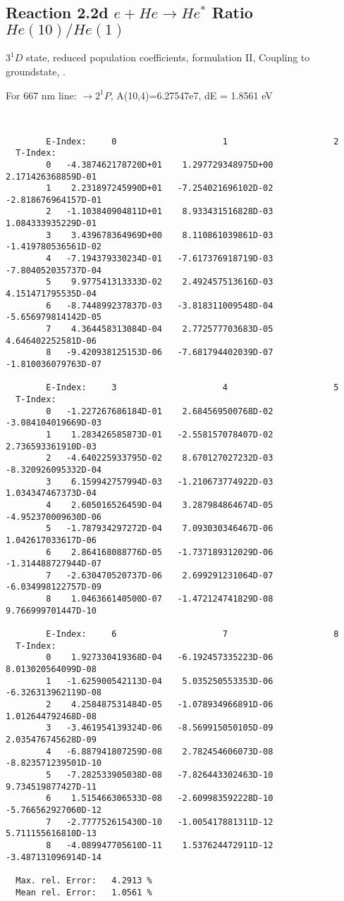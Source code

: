 \documentclass[12pt,dvipdfmx]{article}
\begin{document}
\subsection{
  Reaction 2.2d $e + He \rightarrow He^*  $ Ratio $He(10)/He(1)$
}

  $3^1D$ state,
  reduced population coefficients, formulation II,
  Coupling to groundstate, \cite{kn:Fujimoto}.

  For 667 nm line: $\rightarrow 2^1P$, A(10,4)=6.27547e7, dE = 1.8561 eV

\begin{small}\begin{verbatim}


        E-Index:     0                     1                     2
  T-Index:
        0   -4.387462178720D+01    1.297729348975D+00    2.171426368859D-01
        1    2.231897245990D+01   -7.254021696102D-02   -2.818676964157D-01
        2   -1.103840904811D+01    8.933431516828D-03    1.084333935229D-01
        3    3.439678364969D+00    8.110861039861D-03   -1.419780536561D-02
        4   -7.194379330234D-01   -7.617376918719D-03   -7.804052035737D-04
        5    9.977541313333D-02    2.492457513616D-03    4.151471795535D-04
        6   -8.744899237837D-03   -3.818311009548D-04   -5.656979814142D-05
        7    4.364458313084D-04    2.772577703683D-05    4.646402252581D-06
        8   -9.420938125153D-06   -7.681794402039D-07   -1.810036079763D-07

        E-Index:     3                     4                     5
  T-Index:
        0   -1.227267686184D-01    2.684569500768D-02   -3.084104019669D-03
        1    1.283426585873D-01   -2.558157078407D-02    2.736593361910D-03
        2   -4.640225933795D-02    8.670127027232D-03   -8.320926095332D-04
        3    6.159942757994D-03   -1.210673774922D-03    1.034347467373D-04
        4    2.605016526459D-04    3.287984864674D-05   -4.952370009630D-06
        5   -1.787934297272D-04    7.093030346467D-06    1.042617033617D-06
        6    2.864168088776D-05   -1.737189312029D-06   -1.314488727944D-07
        7   -2.630470520737D-06    2.699291231064D-07   -6.034998122757D-09
        8    1.046366140500D-07   -1.472124741829D-08    9.766999701447D-10

        E-Index:     6                     7                     8
  T-Index:
        0    1.927330419368D-04   -6.192457335223D-06    8.013020564099D-08
        1   -1.625900542113D-04    5.035250553353D-06   -6.326313962119D-08
        2    4.258487531484D-05   -1.078934966891D-06    1.012644792468D-08
        3   -3.461954139324D-06   -8.569915050105D-09    2.035476745628D-09
        4   -6.887941807259D-08    2.782454606073D-08   -8.823571239501D-10
        5   -7.282533905038D-08   -7.826443302463D-10    9.734519877427D-11
        6    1.515466306533D-08   -2.609983592228D-10   -5.766562927060D-12
        7   -2.777752615430D-10   -1.005417881311D-12    5.711155616810D-13
        8   -4.089947705610D-11    1.537624472911D-12   -3.487131096914D-14

  Max. rel. Error:   4.2913 %
  Mean rel. Error:   1.0561 %


\end{verbatim}\end{small}
\end{document}
